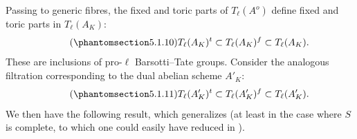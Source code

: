 Passing to generic fibres, the fixed and toric parts of $T_\ell(A^o)$
define fixed and toric parts in $T_\ell(A_K)$:
\begin{equation}\tag{\SGARefTarget{sga7.sga7i.eix.n5-1-10}{5.1.10}}
 T_\ell(A_K)^t\subset T_\ell(A_K)^f\subset T_\ell(A_K).
\end{equation}
These are inclusions of pro-$\ell$ Barsotti--Tate groups.  Consider the
analogous filtration corresponding to the dual abelian scheme $A'_K$:
\begin{equation}\tag{\SGARefTarget{sga7.sga7i.eix.n5-1-11}{5.1.11}}
 T_\ell(A'_K)^t\subset T_\ell(A'_K)^f\subset T_\ell(A'_K).
\end{equation}
We then have the following result, which generalizes  (at least in
the case where $S$ is complete, to which one could easily have reduced
in ).

